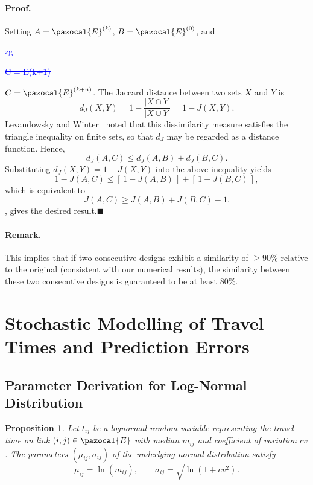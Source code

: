 \documentclass[a4paper,fleqn]{cas-sc}
\newtheorem{proposition}{Proposition}
\newcommand{\stkout}[1]{\ifmmode\text{\sout{\ensuremath{#1}}}\else\sout{#1}\fi}
\newcommand\rev[3]{\textcolor{blue}{\begin{scriptsize}{#1}\end{scriptsize}\stkout{#2}}\textcolor{red}{#3}}
\newcommand\rev[3]{\ignorespaces#3\ignorespaces\unskip}
\begin{document}
\paragraph{Proof.}
Setting $A=\pazocal{E}^{(k)}$, $B=\pazocal{E}^{(0)}$, and \rev{zg}{C = E(k+1)}{$C=\pazocal{E}^{(k+n)}$}.
The Jaccard distance between two sets $X$ and $Y$ is
\[
d_J(X,Y)=1-\frac{|X\cap Y|}{|X\cup Y|}=1-J(X,Y).
\]
Levandowsky and Winter~\citep{levandowsky1971distance} noted that this
dissimilarity measure satisfies the triangle inequality on finite sets,
so that $d_J$ may be regarded as a distance function. Hence,
\[
d_J(A,C)\le d_J(A,B)+d_J(B,C).
\]
Substituting $d_J(X,Y)=1-J(X,Y)$ into the above inequality yields
\[
1-J(A,C)
\le [\,1-J(A,B)\,]+[\,1-J(B,C)\,],
\]
which is equivalent to
\[
J(A,C)\ge J(A,B)+J(B,C)-1.
\]
, gives the desired result.\hfill$\blacksquare$

\paragraph{Remark.}
This implies that if two consecutive designs exhibit a similarity of $\geq 90\%$ relative to the original (consistent with our numerical results), the similarity between these two consecutive designs is guaranteed to be at least 80\%.
\section{Stochastic Modelling of Travel Times and Prediction Errors}

\subsection{Parameter Derivation for Log-Normal Distribution}\label{Appendix:log_normal}

\begin{proposition}
\label{prop:lognormal}
Let $t_{ij}$ be a lognormal random variable representing the travel time on link $(i,j)\in\pazocal{E}$ with median $m_{ij}$ and coefficient of 
variation $cv$. The parameters $(\mu_{ij},\sigma_{ij})$ of the underlying normal 
distribution satisfy
\[
    \mu_{ij} = \ln(m_{ij}), 
    \qquad
    \sigma_{ij} = \sqrt{\ln(1 + cv^{2})}.
\]
\end{proposition}
\end{document}
